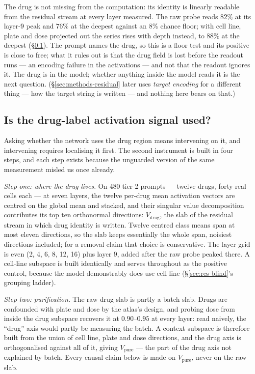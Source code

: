\begin{claim}
The drug is not missing from the computation: its identity is linearly readable from the residual
stream at every layer measured. The raw probe reads $82\%$ at its layer-9 peak and $76\%$ at the
deepest against an $8\%$ chance floor; with cell line, plate and dose projected out the series rises
with depth instead, to $88\%$ at the deepest (\S\ref{sec:res-used}). The prompt names the drug, so
this is a floor test and its positive is close to free; what it
rules out is that the drug field is lost before the readout runs --- an encoding failure in the
activations --- and not that the readout ignores it. The drug is in the model; whether anything
inside the model reads it is the next question. (\S\ref{sec:methods-residual} later uses
\emph{target encoding} for a different thing --- how the target string is written --- and nothing
here bears on that.)
\end{claim}

\subsection{Is the drug-label activation signal used?}
\label{sec:res-used}

Asking whether the network uses the drug region means intervening on it, and intervening requires
localising it first. The second instrument is built in four steps, and each step exists because the
unguarded version of the same measurement misled us once already.

\emph{Step one: where the drug lives.} On $480$ tier-2 prompts --- twelve drugs, forty real cells
each --- at seven layers, the twelve per-drug mean activation vectors are centred on the global mean
and stacked, and their singular value decomposition contributes its top ten orthonormal directions:
$V_{\textrm{drug}}$, the slab of the residual stream in which drug identity is written. Twelve
centred class means span at most eleven directions, so the slab keeps essentially the whole span,
noisiest directions included; for a removal claim that choice is conservative. The layer grid is
even (2, 4, 6, 8, 12, 16) plus layer 9, added after the raw probe peaked there. A cell-line subspace
is built identically and serves throughout as the positive control, because the model demonstrably
does use cell line (\S\ref{sec:res-blind}'s grouping ladder).

\emph{Step two: purification.} The raw drug slab is partly a batch slab. Drugs are confounded with
plate and dose by the atlas's design, and probing dose from inside the drug subspace recovers it at
$0.90$--$0.95$ at every layer: read naively, the ``drug'' axis would partly be measuring the batch.
A context subspace is therefore built from the union of cell line, plate and dose directions, and
the drug axis is orthogonalised against all of it, giving $V_{\textrm{pure}}$ --- the part of the
drug axis not explained by batch. Every causal claim below is made on $V_{\textrm{pure}}$, never on
the raw slab.

